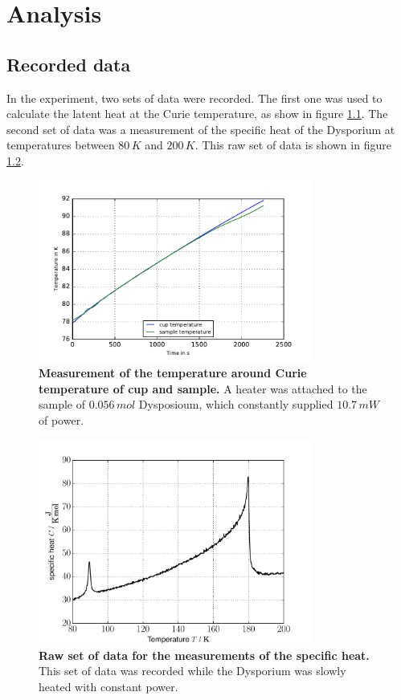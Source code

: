\documentclass{include/thesisclass3}
\newcommand{\e}[1]{\,\si{#1}}
\begin{document}
\chapter{Analysis}


\section{Recorded data}
In the experiment, two sets of data were recorded.
The first one was used to calculate the latent heat at the Curie temperature, as show in figure \ref{latent_raw_j}.
The second set of data was a measurement of the specific heat of the Dysporium at temperatures between $80\e{K}$ and $200\e{K}$. This raw set of data is shown in figure \ref{data}.
\begin{figure}[ht]
\includegraphics[width = 0.8\textwidth]{fig/latent_raw_j.pdf}
\caption{\label{latent_raw_j}\textbf{Measurement of the temperature around Curie temperature of cup and sample.} A heater was attached to the sample of $0.056\e{mol}$ Dysposioum, which constantly supplied $10.7\e{mW}$ of power.}
\end{figure}
\begin{figure}[ht]
\includegraphics[width = 0.8\textwidth]{fig/data.pdf}
\caption{\label{data}\textbf{Raw set of data for the measurements of the specific heat.} This set of data was recorded while the Dysporium was slowly heated with constant power.}
\end{figure}
\end{document}
